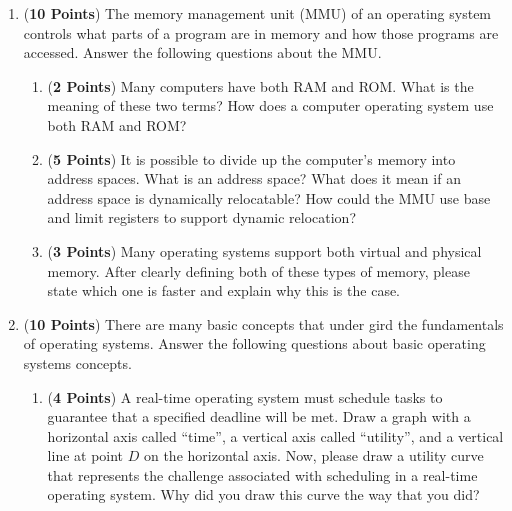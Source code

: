 \documentclass[12pt,epsf,psfig,graphics]{article}
\begin{document}
\begin{enumerate}
  
\item ({\bf 10 Points}) The memory management unit (MMU) of an operating system controls what parts of a program are in
  memory and how those programs are accessed.  Answer the following questions about the MMU.
  
  \begin{enumerate}
          
  \item ({\bf 2 Points}) Many computers have both RAM and ROM.  What is the meaning of these two terms?  How does a
    computer operating system use both RAM and ROM?

  \item ({\bf 5 Points}) It is possible to divide up the computer's memory into address spaces.  What is an address
    space?  What does it mean if an address space is dynamically relocatable? How could the MMU use base and limit
    registers to support dynamic relocation?   

  \item ({\bf 3 Points}) Many operating systems support both virtual and physical memory.  After clearly defining both
    of these types of memory, please state which one is faster and explain why this is the case.
    
  \end{enumerate}
        
\newpage

% 
\item ({\bf 10 Points}) There are many basic concepts that under gird the fundamentals of operating systems.  Answer the
  following questions about basic operating systems concepts.

  \begin{enumerate}
          
  \item ({\bf 4 Points}) A real-time operating system must schedule tasks to guarantee that a specified deadline will be
    met.  Draw a graph with a horizontal axis called ``time'', a vertical axis called ``utility'', and a vertical line
    at point $D$ on the horizontal axis.  Now, please draw a utility curve that represents the challenge associated with
    scheduling in a real-time operating system. Why did you draw this curve the way that you did?


\end{enumerate}
\end{enumerate}
\end{document}
